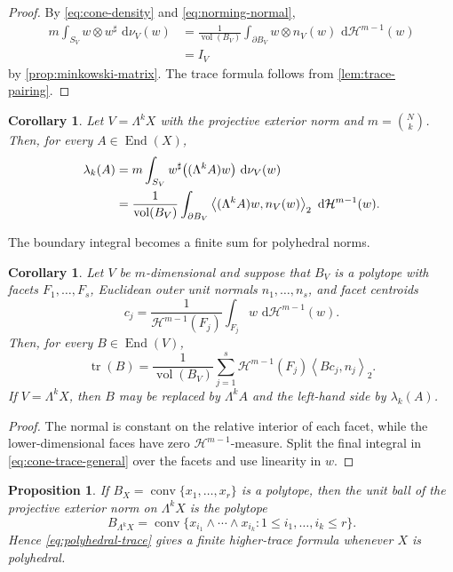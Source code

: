 \documentclass[11pt,a4paper]{amsart}
\numberwithin{equation}{section}
\theoremstyle{plain}
\newtheorem{proposition}[theorem]{Proposition}
\newtheorem{corollary}[theorem]{Corollary}
\theoremstyle{definition}
\theoremstyle{remark}
\DeclareMathOperator{\End}{End}
\DeclareMathOperator{\tr}{tr}
\DeclareMathOperator{\vol}{vol}
\newcommand{\dd}{\,\mathrm{d}}
\newcommand{\Id}{I}
\newcommand{\ip}[2]{\left\langle #1,#2\right\rangle_2}
\begin{document}
\begin{proof}
By \eqref{eq:cone-density} and \eqref{eq:norming-normal},
\begin{align*}
m\int_{S_V}w\otimes w^\sharp\,\dd\nu_V(w)
&=\frac1{\vol(B_V)}
  \int_{\partial B_V}w\otimes n_V(w)\,\dd\mathcal H^{m-1}(w)\\
&=\Id_V
\end{align*}
by \cref{prop:minkowski-matrix}. The trace formula follows from \cref{lem:trace-pairing}.
\end{proof}

\begin{corollary}\label{cor:cone-higher}
Let $V=\Lambda^kX$ with the projective exterior norm and $m=\binom Nk$. Then, for every $A\in\End(X)$,
\begin{align}\label{eq:cone-higher}
\lambda_k(A)
&=m\int_{S_V}w^\sharp\big((\Lambda^kA)w\big)\,\dd\nu_V(w)\notag\\
&=\frac1{\vol(B_V)}
  \int_{\partial B_V}\ip{(\Lambda^kA)w}{n_V(w)}\,\dd\mathcal H^{m-1}(w).
\end{align}
\end{corollary}

The boundary integral becomes a finite sum for polyhedral norms.

\begin{corollary}\label{cor:polyhedral}
Let $V$ be $m$-dimensional and suppose that $B_V$ is a polytope with facets $F_1,\ldots,F_s$, Euclidean outer unit normals $n_1,\ldots,n_s$, and facet centroids
\[
c_j=\frac1{\mathcal H^{m-1}(F_j)}\int_{F_j}w\,\dd\mathcal H^{m-1}(w).
\]
Then, for every $B\in\End(V)$,
\begin{equation}\label{eq:polyhedral-trace}
\tr(B)=\frac1{\vol(B_V)}
\sum_{j=1}^s\mathcal H^{m-1}(F_j)\ip{Bc_j}{n_j}.
\end{equation}
If $V=\Lambda^kX$, then $B$ may be replaced by $\Lambda^kA$ and the left-hand side by $\lambda_k(A)$.
\end{corollary}

\begin{proof}
The normal is constant on the relative interior of each facet, while the lower-dimensional faces have zero $\mathcal H^{m-1}$-measure. Split the final integral in \eqref{eq:cone-trace-general} over the facets and use linearity in $w$.
\end{proof}

\begin{proposition}\label{prop:exterior-polytope}
If $B_X=\operatorname{conv}\{x_1,\ldots,x_r\}$ is a polytope, then the unit ball of the projective exterior norm on $\Lambda^kX$ is the polytope
\begin{equation}\label{eq:exterior-polytope}
B_{\Lambda^kX}
=\operatorname{conv}\{x_{i_1}\wedge\cdots\wedge x_{i_k}:
1\leqslant i_1,\ldots,i_k\leqslant r\}.
\end{equation}
Hence \eqref{eq:polyhedral-trace} gives a finite higher-trace formula whenever $X$ is polyhedral.
\end{proposition}
\end{document}
